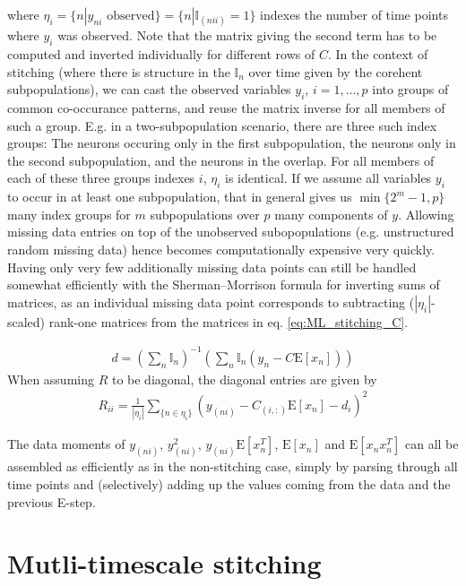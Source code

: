 \documentclass[10pt,letterpaper]{article}
\begin{document}
where $\eta_i = \{n| y_{ni} \mbox{ observed}\}= \{n| \mathbb{I}_{(nii)} = 1\}$ indexes the number of time points where $y_i$ was observed. Note that the matrix giving the second term has to be computed and inverted individually for different rows of $C$. In the context of stitching (where there is structure in the $\mathbb{I}_n$ over time given by the corehent subpopulations), we can cast the observed variables $y_i$, $i = 1, \ldots, p$ into groups of common co-occurance patterns, and reuse the matrix inverse for all members of such a group. E.g. in a two-subpopulation scenario, there are three such index groups: The neurons occuring only in the first subpopulation, the neurons only in the second subpopulation, and the neurons in the overlap. For all members of each of these three groups indexes $i$, $\eta_i$ is identical. If we assume all variables $y_i$ to occur in at least one subpopulation, that in general gives us $\min\{2^m - 1, p\}$ many index groups for $m$ subpopulations over $p$ many components of $y$. Allowing missing data entries on top of the unobserved subopopulations (e.g. unstructured random missing data) hence becomes computationally expensive very quickly. Having only very few additionally missing data points can still be handled somewhat efficiently with the Sherman–Morrison formula for inverting sums of matrices, as an individual missing data point corresponds to subtracting ($|\eta_i|$-scaled) rank-one matrices from the matrices in eq. \ref{eq:ML_stitching_C}.

\begin{align}
d = \left(\sum_n \mathbb{I}_n \right)^{-1} \left( \sum_n \mathbb{I}_n \left( y_n - C\mbox{E}[x_n] \right) \right) 
\end{align}
When assuming $R$ to be diagonal, the diagonal entries are given by
\begin{align}
R_{ii} = \frac{1}{|\eta_i|} \sum_{\{n \in \eta_i\}} \left( y_{(ni)}- C_{(i,:)} \mbox{E}[x_n] - d_i \right)^2 
\end{align}

\noindent{}The data moments of $y_{(ni)}$, $y_{(ni)}^2$, $y_{(ni)} \mbox{E}[x_n^T]$, $\mbox{E}[x_n]$ and $\mbox{E}[x_n x_n^T]$ can all be assembled as efficiently as in the non-stitching case, simply by parsing through all time points and (selectively) adding up the values coming from the data and the previous E-step. 

\section{Mutli-timescale stitching}
\end{document}
